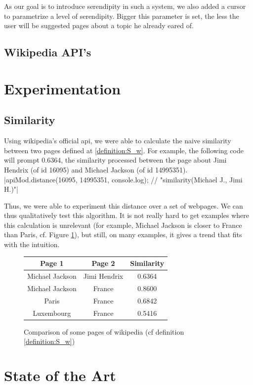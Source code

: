 \documentclass[11pt]{article}
\theoremstyle{plain}
\theoremstyle{definition}
\theoremstyle{remark}
\begin{document}
As our goal is to introduce serendipity in such a system, we also added a cursor to parametrize a level of serendipity. Bigger this parameter is set, the less the user will be suggested pages about a topic he already eared of.

\subsection{Wikipedia API's}


\section{Experimentation}
\subsection{Similarity}
Using wikipedia's official api, we were able to calculate the naive similarity between two pages defined at \ref{definition:S_w}. For example, the following code will prompt $0.6364$, the similarity processed between the page about Jimi Hendrix (of id 16095) and Michael Jackson (of id 14995351).
  |apiMod.distance(16095, 14995351, console.log); // "similarity(Michael J.,  Jimi H.)"|
  
Thus, we were able to experiment this distance over a set of webpages. We can thus qualitatively test this algorithm. It is not really hard to get examples where this calculation is unrelevant (for example, Michael Jackson is closer to France than Paris, cf. Figure \ref{fig:similarity}), but still, on many examples, it gives a trend that fits with the intuition.

\begin{figure}
    \caption{Comparison of some pages of wikipedia (cf definition \ref{definition:S_w})}
    \label{fig:similarity}
	\centering
	\begin{tabular}{c|c|c}
		Page 1			&	Page 2			&	Similarity \\
		\hline\hline
		Michael Jackson	&	Jimi Hendrix	&	0.6364	\\
		Michael Jackson	&	France			&	0.8600	\\
		Paris			&	France			&	0.6842	\\
		Luxembourg		&	France			&	0.5416	\\
  \end{tabular}
\end{figure}


\section{State of the Art}






\end{document}
